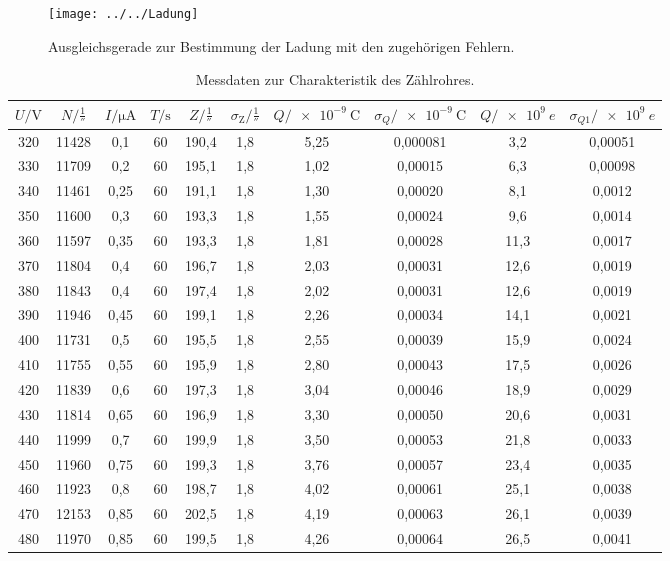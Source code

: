 \begin{figure}[h!]
	\centering
	\texttt{[image: ../../Ladung]}
	\caption{Ausgleichsgerade zur Bestimmung der Ladung mit den zugehörigen Fehlern.}
	\label{fig:ladung}
\end{figure}

\begin{table}[htpb]
	\centering
	\caption{Messdaten zur Charakteristik des Zählrohres.}
	\label{tab:ladung}
	\begin{tabular}{c c c c c c c c c c}
		\toprule
		$U / \si{\volt}$ & $N / \si{\frac{1}{\second}}$ & $I / \si{\micro\ampere}$ & $T / \si{\second}$ & $Z / \si{\frac{1}{\second}}$ & $\sigma_\text{Z} / \si{\frac{1}{\second}}$ & $Q / \SI{e-9}{\coulomb}$ & $\sigma_{Q} / \SI{e-9}{\coulomb}$ & $Q / \SI{e9}{\elementarycharge}$ & $\sigma_{Q1} / \SI{e9}{\elementarycharge}$ \\
		\midrule
		320	&11428&	0,1 &60&190,4&1,8&5,25&0,000081&3,2&0,00051 \\
		330	&11709&	0,2	&60&195,1&1,8&1,02&0,00015&6,3&0,00098 \\
		340	&11461&	0,25&60&191,1&1,8&1,30&0,00020&8,1&0,0012\\
		350	&11600&	0,3	&60&193,3&1,8&1,55&0,00024&9,6&0,0014\\
		360	&11597&	0,35&60&193,3&1,8&1,81&0,00028&11,3&0,0017\\
		370	&11804&	0,4	&60&196,7&1,8&2,03&0,00031&12,6&0,0019\\
		380	&11843&	0,4	&60&197,4&1,8&2,02&0,00031&12,6&0,0019\\
		390	&11946&	0,45&60&199,1&1,8&2,26&0,00034&14,1&0,0021\\
		400	&11731&	0,5	&60&195,5&1,8&2,55&0,00039&15,9&0,0024\\
		410	&11755&	0,55&60&195,9&1,8&2,80&0,00043&17,5&0,0026\\
		420	&11839&	0,6	&60&197,3&1,8&3,04&0,00046&18,9&0,0029\\
		430	&11814&	0,65&60&196,9&1,8&3,30&0,00050&20,6&0,0031\\
		440	&11999&	0,7	&60&199,9&1,8&3,50&0,00053&21,8&0,0033\\
		450	&11960&	0,75&60&199,3&1,8&3,76&0,00057&23,4&0,0035\\
		460	&11923&	0,8	&60&198,7&1,8&4,02&0,00061&25,1&0,0038\\
		470	&12153&	0,85&60&202,5&1,8&4,19&0,00063&26,1&0,0039\\
		480	&11970&	0,85&60&199,5&1,8&4,26&0,00064&26,5&0,0041\\

\end{tabular}
\end{table}
